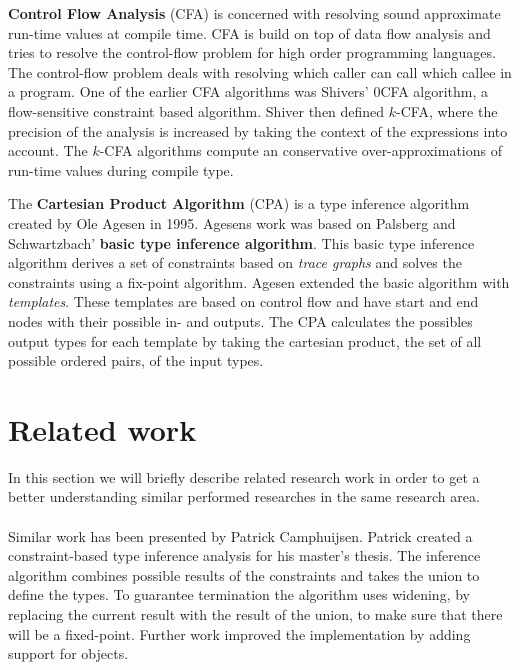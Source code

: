 \documentclass[../main.tex]{subfiles}
\begin{document}
    \textbf{Control Flow Analysis}\cite{Nie:99} (CFA) is concerned with resolving sound approximate run-time values at compile time.
    CFA is build on top of data flow analysis\cite{Aho:86} and tries to resolve the control-flow problem for high order programming languages.
    The control-flow problem deals with resolving which caller can call which callee in a program.
    One of the earlier CFA algorithms was Shivers' $0$CFA algorithm\cite{Shi:88}, a flow-sensitive constraint based algorithm.
    Shiver then defined $k$-CFA\cite{Shi:91}, where the precision of the analysis is increased by taking the context of the expressions into account.
    The $k$-CFA algorithms compute an conservative over-approximations of run-time values during compile type.
	
    The \textbf{Cartesian Product Algorithm}\cite{Age:95} (CPA) is a type inference algorithm created by Ole Agesen in 1995.
    Agesens work was based on Palsberg and Schwartzbach' \textbf{basic type inference algorithm}\cite{Pal:91}.
    This basic type inference algorithm derives a set of constraints based on \textit{trace graphs} and solves the constraints using a fix-point algorithm.
    Agesen extended the basic algorithm with \textit{templates}.
    These templates are based on control flow and have start and end nodes with their possible in- and outputs.
    The CPA calculates the possibles output types for each template by taking the cartesian product, the set of all possible ordered pairs, of the input types.

    \section{Related work}\label{sec:background_related-work}
    In this section we will briefly describe related research work in order to get a better understanding similar performed researches in the same research area.
    
    \paragraph{}
    Similar work has been presented by Patrick Camphuijsen\cite{Cam:07, Cam:09}.
    Patrick created a constraint-based type inference analysis for his master's thesis.
    The inference algorithm combines possible results of the constraints and takes the union to define the types.
    To guarantee termination the algorithm uses widening, by replacing the current result with the result of the union, to make sure that there will be a fixed-point.
    Further work improved the implementation by adding support for objects\cite{Hoe:15}.
    
\end{document}
